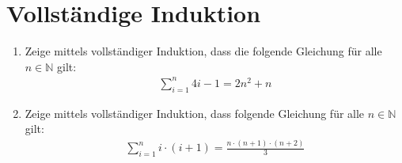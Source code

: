 \documentclass[11pt, a4paper]{article}
\newcommand\braces[1]{\left(#1\right)}
\newif\ifshowsolution
\begin{document}
\section{Vollständige Induktion} %
\begin{enumerate}[label=\alph*)]
	\item Zeige mittels vollständiger Induktion, dass die folgende Gleichung für alle $n \in \mathbb{N}$ gilt:
		\begin{align*}
			\sum_{i=1}^n 4i - 1 = 2n^2 + n
		\end{align*}
		
		\ifshowsolution
			\begin{align*}
				\intertext{\textbf{Induktionsanfang:} Wir zeigen, dass die Gleichung für $n = 1$ gilt:}
				\sum_{i=1}^1 4i - 1 &= 2 \cdot 1^2 + 1\\
				4 \cdot 1 - 1 &= 2 + 1\\
				3 &= 3 \ \textcolor{DarkGreen}{\checkmark}
				\intertext{\textbf{Induktionsschritt:} Nun müssen wir zeigen, dass die Gleichung auch für $n + 1$ gilt:}
				\sum_{i=1}^{n+1} 4i - 1 &= 2(n+1)^2 + (n+1)\\
				\intertext{Die Summe bis $n+1$ können wir in die Summe bis $n$ und den $(n+1)$ten Summanden aufteilen:}
				\braces{\sum_{i=1}^n 4i - 1} + \braces{4(n+1) - 1} &= 2(n+1)^2 + (n+1)\\
				\intertext{Nach der Induktionsannahme (Aufgabenstellung) können wir die Summe bis $n$ wie folgt ersetzen:}
				(2n^2 + n) + (4(n+1) -1) &= 2(n+1)^2 + (n+1)\\
				\intertext{Nun erhalten wir durch Vereinfachen beider Seiten:}
				2n^2 + n + 4n + 4 - 1 &= 2(n^2 + 2n + 1) + n + 1\\
				2n^2 + 5n + 3 &= 2n^2 + 4n + 2 + n + 1\\
				2n^2 + 5n + 3 &= 2n^2 + 5n + 3 \qquad \quad \textcolor{DarkGreen}{\checkmark}
			\end{align*}
		\fi
	\item Zeige mittels vollständiger Induktion, dass folgende Gleichung für alle $n \in \mathbb{N}$ gilt:
		\begin{align*}
			\sum_{i=1}^n i \cdot (i + 1) = \frac{n\cdot(n+1)\cdot(n+2)}{3}
		\end{align*}
		

\end{enumerate}
\end{document}
